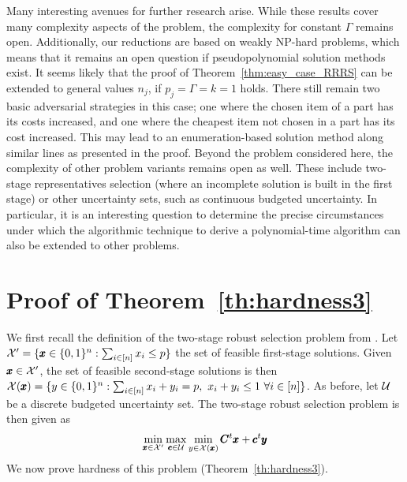 Many interesting avenues for further research arise. 
While these results cover many complexity aspects of the problem, the complexity for constant $\Gamma$ remains open. Additionally, our reductions are based on weakly NP-hard problems, which means that it remains an open question if pseudopolynomial solution methods exist.
It seems likely that the proof of Theorem~\ref{thm:easy_case_RRRS} can be extended to general values $n_j$, if $p_j=\Gamma = k = 1$ holds. There still remain two basic adversarial strategies in this case; one where the chosen item of a part has its costs increased, and one where the cheapest item not chosen in a part has its cost increased. This may lead to an enumeration-based solution method along similar lines as presented in the proof.
Beyond the problem considered here, the complexity of other problem variants remains open as well. These include two-stage representatives selection (where an incomplete solution is built in the first stage) or other uncertainty sets, such as continuous budgeted uncertainty. In particular, it is an interesting question to determine the precise circumstances under which the algorithmic technique to derive a polynomial-time algorithm can also be extended to other problems.


\section{Proof of Theorem~\ref{th:hardness3}}

We first recall the definition of the two-stage robust selection problem from \cite{chassein2018recoverable}. Let $\mathcal{X}' = \{ \pmb{x}\in\{0,1\}^n : \sum_{i\in[n]} x_i \le p\}$ the set of feasible first-stage solutions. Given $\pmb{x}\in\mathcal{X}'$, the set of feasible second-stage solutions is then $\X(\pmb{x}) = \{ y\in\{0,1\}^n : \sum_{i\in[n]} x_i + y_i = p,\ x_i+ y_i \le 1 \ \forall i\in[n]\}$. As before, let $\mathcal{U}$ be a discrete budgeted uncertainty set. The two-stage robust selection problem is then given as
\[ \min_{\pmb{x}\in\mathcal{X}'} \max_{\pmb{c}\in\mathcal{U}} \min_{y\in\mathcal{X}(\pmb{x})} \pmb{C}^t\pmb{x} + \pmb{c}^t\pmb{y} \]
We now prove hardness of this problem (Theorem~\ref{th:hardness3}).

